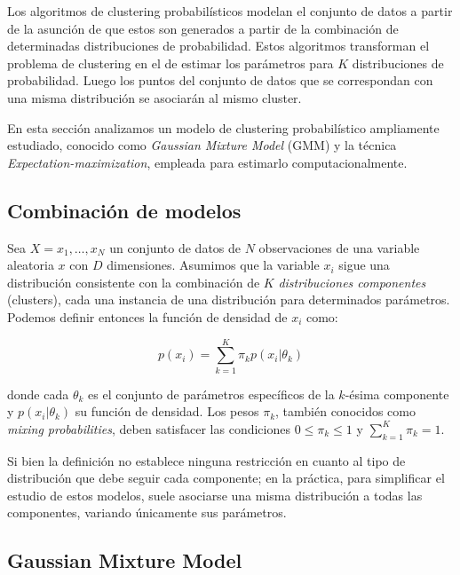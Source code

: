 Los algoritmos de clustering probabilísticos modelan el conjunto de datos a partir de la asunción de que estos son generados a partir de la combinación de determinadas distribuciones de probabilidad.
Estos algoritmos transforman el problema de clustering en el de estimar los parámetros para $K$ distribuciones de probabilidad.
Luego los puntos del conjunto de datos que se correspondan con una misma distribución se asociarán al mismo cluster.

En esta sección analizamos un modelo de clustering probabilístico ampliamente estudiado, conocido como \textit{Gaussian Mixture Model} (GMM) y la técnica \textit{Expectation-maximization}, empleada para estimarlo computacionalmente.

\subsection{Combinación de modelos}\label{subsec:mixtureModels}

Sea $X={x_1,\dots,x_N}$ un conjunto de datos de $N$ observaciones de una variable aleatoria $x$ con $D$ dimensiones.
Asumimos que la variable $x_i$ sigue una distribución consistente con la combinación de $K$ \textit{distribuciones componentes} (clusters), cada una instancia de una distribución para determinados parámetros.
Podemos definir entonces la función de densidad de $x_i$ como:

\begin{equation}
    \label{eq:mixtureModels}
    p(x_i)=\sum_{k=1}^{K}{\pi_k p(x_i|\theta_k)}
\end{equation}

\noindent
donde cada $\theta_k$ es el conjunto de parámetros específicos de la $k$-ésima componente y $p(x_i|\theta_k)$ su función de densidad.
Los pesos $\pi_k$, también conocidos como \textit{mixing probabilities}, deben satisfacer las condiciones $0\leq \pi_k \leq 1$ y $\sum_{k=1}^{K}{\pi_k}=1$.

Si bien la definición no establece ninguna restricción en cuanto al tipo de distribución que debe seguir cada componente;
en la práctica, para simplificar el estudio de estos modelos, suele asociarse una misma distribución a todas las componentes, variando únicamente sus parámetros.

\subsection{Gaussian Mixture Model}\label{subsec:GMM}

